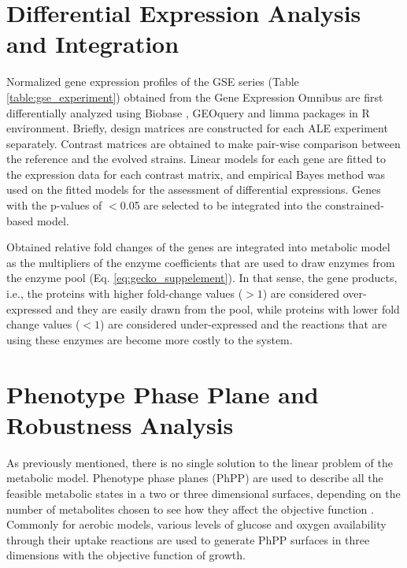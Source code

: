 \section{Differential Expression Analysis and Integration}
Normalized gene expression profiles of the GSE series (Table \ref{table:gse_experiment}) obtained from the Gene Expression Omnibus are first differentially analyzed using Biobase \cite{huber2015orchestrating}, GEOquery \cite{davis2007geoquery} and limma \cite{ritchie2015limma} packages in R environment. Briefly, design matrices are constructed for each ALE experiment separately. Contrast matrices are obtained to make pair-wise comparison between the reference and the evolved strains. Linear models for each gene are fitted to the expression data for each contrast matrix, and empirical Bayes method was used on the fitted models for the assessment of differential expressions. Genes with the p-values of $<$0.05 are selected to be integrated into the constrained-based model.



Obtained relative fold changes of the genes are integrated into metabolic model as the multipliers of the enzyme coefficients that are used to draw enzymes from the enzyme pool (Eq. \ref{eq:gecko_suppelement}). In that sense, the gene products, i.e., the proteins with higher fold-change values ($>1$) are considered over-expressed and they are easily drawn from the pool, while proteins with lower fold change values ($<1$) are considered under-expressed and the reactions that are using these enzymes are become more costly to the system.



\section{Phenotype Phase Plane and Robustness Analysis}

As previously mentioned, there is no single solution to the linear problem of the metabolic model. Phenotype phase planes (PhPP) are used to describe all the feasible metabolic states in a two or three dimensional surfaces, depending on the number of metabolites chosen to see how they affect the objective function \cite{edwards2002characterizing}. Commonly for aerobic models, various levels of glucose and oxygen availability through their uptake reactions are used to generate PhPP surfaces in three dimensions with the objective function of growth.

